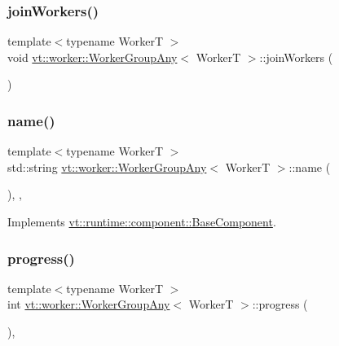 \subsubsection{\texorpdfstring{join\+Workers()}{joinWorkers()}}
{\footnotesize\ttfamily template$<$typename WorkerT $>$ \\
void \hyperlink{structvt_1_1worker_1_1_worker_group_any}{vt\+::worker\+::\+Worker\+Group\+Any}$<$ WorkerT $>$\+::join\+Workers (\begin{DoxyParamCaption}{ }\end{DoxyParamCaption})}

\mbox{\label{structvt_1_1worker_1_1_worker_group_any_a29dc03c300f442508501671d9ec1eecd}} 
\subsubsection{\texorpdfstring{name()}{name()}}
{\footnotesize\ttfamily template$<$typename WorkerT $>$ \\
std\+::string \hyperlink{structvt_1_1worker_1_1_worker_group_any}{vt\+::worker\+::\+Worker\+Group\+Any}$<$ WorkerT $>$\+::name (\begin{DoxyParamCaption}{ }\end{DoxyParamCaption})\hspace{0.3cm}{\ttfamily [inline]}, {\ttfamily [override]}, {\ttfamily [virtual]}}



Implements \hyperlink{structvt_1_1runtime_1_1component_1_1_base_component_a7701485f3539f78d42e6bad47fc7eb78}{vt\+::runtime\+::component\+::\+Base\+Component}.

\mbox{\label{structvt_1_1worker_1_1_worker_group_any_a1a2d6dc321514501e00c0373f2583146}} 
\subsubsection{\texorpdfstring{progress()}{progress()}}
{\footnotesize\ttfamily template$<$typename WorkerT $>$ \\
int \hyperlink{structvt_1_1worker_1_1_worker_group_any}{vt\+::worker\+::\+Worker\+Group\+Any}$<$ WorkerT $>$\+::progress (\begin{DoxyParamCaption}{ }\end{DoxyParamCaption})\hspace{0.3cm}{\ttfamily [override]}, {\ttfamily [virtual]}}



